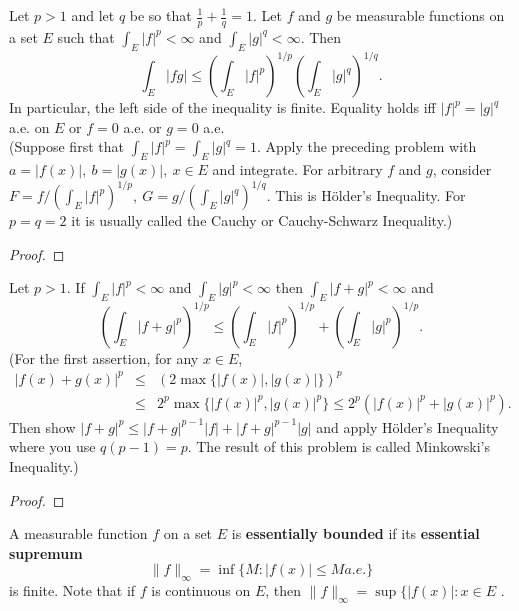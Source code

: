 \begin{pblm}%
	Let $p > 1$ and let $q$ be so that $\frac{1}{p} + \frac{1}{q} = 1$. Let $f$ and $g$ 
	be measurable functions on a set $E$ such that $\int_E |f|^p < \infty$ and 
	$\int_E|g|^q<\infty$. Then 
	\begin{equation*}
		\int_E|fg|\le\left(\int_E|f|^p\right)^{1/p}\left(\int_E|g|^q\right)^{1/q}. 
	\end{equation*}
	In particular, the left side of the inequality is finite. Equality holds iff 
	$|f|^p = |g|^q$ a.e. on $E$ or $f = 0$ a.e. or $g=0$ a.e. \\
	{\scriptsize{(Suppose first that $\int_E|f|^p = \int_E|g|^q=1$. Apply the preceding 
	problem with $a=|f(x)|,~b=|g(x)|,~x\in E$ and integrate. For arbitrary $f$ and $g$, 
	consider $F = f/(\int_E|f|^p)^{1/p},~G=g/(\int_E|g|^q)^{1/q}$. This is H\"{o}lder's 
	Inequality. For $p = q = 2$ it is usually called the Cauchy or Cauchy-Schwarz Inequality.)}}
\begin{proof}
\end{proof}
\end{pblm}

\begin{pblm}%
	Let $p > 1$. If $\int_E|f|^p<\infty$ and $\int_E|g|^p<\infty$ then $\int_E|f+g|^p<\infty$ 
	and 
	\begin{equation*}
		\left(\int_E|f+g|^p\right)^{1/p} \le \left(\int_E|f|^p\right)^{1/p} + 
					\left(\int_E|g|^p\right)^{1/p}.
	\end{equation*}
	{\scriptsize{(For the first assertion, for any $x \in E$, 
	\begin{equation*}
	\begin{array}{rcl}
		|f(x)+g(x)|^p & \le &  (2\max\{|f(x)|,|g(x)|\})^p\\
				& \le & 2^p\max\{|f(x)|^p,|g(x)|^p\} 
				\le 2^p(|f(x)|^p + |g(x)|^p). 
	\end{array}
	\end{equation*}
	Then show $|f+g|^p \le |f+g|^{p-1}|f|+|f+g|^{p-1}|g|$ and apply H\"{o}lder's Inequality 
	where you use $q(p - 1) = p$. The result of this problem is called Minkowski's Inequality.)
	}}
\begin{proof}
\end{proof}
\end{pblm}

\begin{defn}%
	A measurable function $f$ on a set $E$ is \textbf{essentially bounded} if its 
	\textbf{essential supremum} 
	\begin{equation*}
		\|f\|_\infty = \inf\{M: |f(x)| \le M a.e.\}
	\end{equation*}
	is finite. Note that if $f$ is continuous on $E$, then $\|f\|_\infty=\sup\{|f(x)|:x\in E$ . 
\end{defn}

